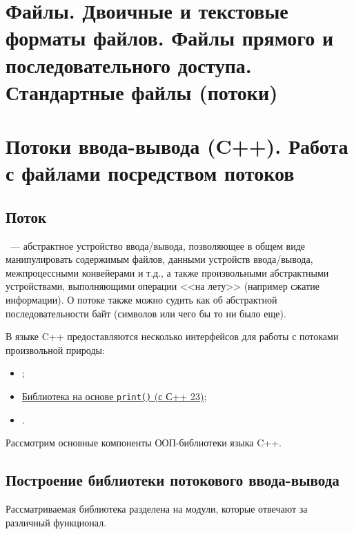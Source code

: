 \section{Файлы. Двоичные и текстовые форматы файлов. Файлы прямого и последовательного доступа. Стандартные файлы (потоки)}
\section{Потоки ввода-вывода (C++). Работа с файлами посредством потоков}
\subsection{Поток}
~--- абстрактное устройство ввода/вывода, позволяющее в общем виде манипулировать содержимым файлов, данными устройств ввода/вывода,
межпроцессными конвейерами и т.д., а также произвольными абстрактными устройствами, выполняющими операции <<на лету>> (например сжатие информации).
О потоке также можно судить как об абстрактной последовательности байт (символов или чего бы то ни было еще).

В языке C++ предоставляются несколько интерфейсов для работы с потоками произвольной природы:
\begin{itemize}
    \item {};
    \item \href{https://en.cppreference.com/w/cpp/io.html#Print_functions_.28since_C.2B.2B23.29}{Библиотека на основе \texttt{print()} (с С++ 23)};
    \item {}.
\end{itemize}

Рассмотрим основные компоненты ООП-библиотеки языка C++.

\subsection{Построение библиотеки потокового ввода-вывода}
Рассматриваемая библиотека разделена на модули, которые отвечают за различный функционал.

